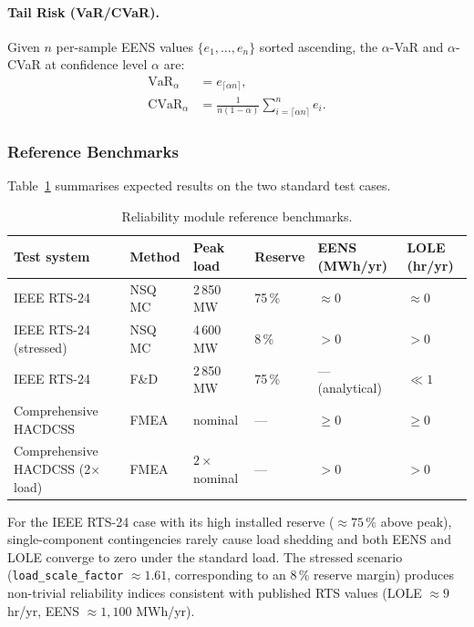 \paragraph{Tail Risk (VaR/CVaR).}
Given $n$ per-sample EENS values $\{e_1,\ldots,e_n\}$ sorted ascending, the
$\alpha$-VaR and $\alpha$-CVaR at confidence level $\alpha$ are:
\begin{align}
  \mathrm{VaR}_\alpha &= e_{\lceil \alpha n \rceil}, \\
  \mathrm{CVaR}_\alpha &= \frac{1}{n(1-\alpha)}
    \sum_{i=\lceil \alpha n \rceil}^{n} e_i.
\end{align}

\subsubsection{Reference Benchmarks}

Table~\ref{tab:reliability-benchmarks} summarises expected results on the two
standard test cases.

\begin{table}[ht]
\centering
\caption{Reliability module reference benchmarks.}
\label{tab:reliability-benchmarks}
\begin{tabular}{llllll}
\hline\hline
\textbf{Test system} & \textbf{Method} & \textbf{Peak load} & \textbf{Reserve} &
  \textbf{EENS (MWh/yr)} & \textbf{LOLE (hr/yr)} \\
\hline
IEEE RTS-24 & NSQ MC & 2\,850 MW & 75\,\% & $\approx 0$ & $\approx 0$ \\
IEEE RTS-24 (stressed) & NSQ MC & 4\,600 MW & 8\,\% & $>0$ & $>0$ \\
IEEE RTS-24 & F\&D & 2\,850 MW & 75\,\% & ---\,(analytical) & $\ll 1$ \\
Comprehensive HACDCSS & FMEA & nominal & --- & $\ge 0$ & $\ge 0$ \\
Comprehensive HACDCSS (2$\times$ load) & FMEA & $2\times$ nominal & --- & $>0$ & $>0$ \\
\hline\hline
\end{tabular}
\end{table}

For the IEEE RTS-24 case with its high installed reserve ($\approx 75\,\%$
above peak), single-component contingencies rarely cause load shedding and
both EENS and LOLE converge to zero under the standard load.  The stressed
scenario (\texttt{load\_scale\_factor} $\approx 1.61$, corresponding to an
8\,\% reserve margin) produces non-trivial reliability indices consistent with
published RTS values (LOLE $\approx 9$ hr/yr, EENS $\approx 1{,}100$ MWh/yr).

